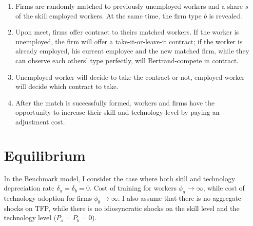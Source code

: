 \documentclass{article}
\newcommand{\1}{\mathbb{1}}
\begin{document}
\begin{enumerate}
\item Firms are randomly matched to previously unemployed workers and a share $s$ of the skill employed workers. At the same time, the firm type $b$ is revealed. 
\item Upon meet, firms offer contract to theirs matched workers. If the worker is unemployed, the firm will offer a take-it-or-leave-it contract; if the worker is already employed, his current employee and the new matched firm, while they can observe each others' type perfectly, will Bertrand-compete in contract. 
\item Unemployed worker will decide to take the contract or not, employed worker will decide which contract to take. 
\item After the match is successfully formed, workers and firms have the opportunity to increase their skill and technology level by paying an adjustment cost. 
\end{enumerate}

\section{Equilibrium}
In the Benchmark model, I consider the case where both skill and technology depreciation rate $\delta_a = \delta_b = 0$. Cost of training for workers $\phi_a \to \infty$, while cost of technology adoption for firms $\phi_b \to \infty$. I also assume that there is no aggregate shocks on TFP, while there is no idiosyncratic shocks on the skill level and the technology level ($P_a = P_b = 0$). 
\end{document}
